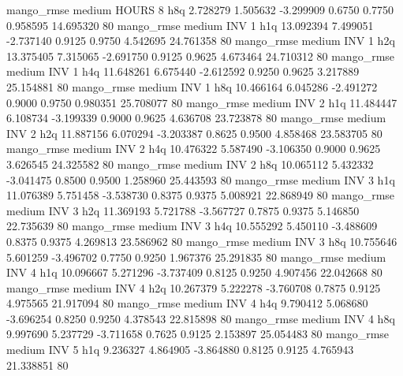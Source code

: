        mango_rmse     medium    HOURS                 8                  h8q  2.728279 1.505632 -3.299909 0.6750 0.7750  0.958595   14.695320 80
       mango_rmse     medium      INV                 1                  h1q 13.092394 7.499051 -2.737140 0.9125 0.9750  4.542695   24.761358 80
       mango_rmse     medium      INV                 1                  h2q 13.375405 7.315065 -2.691750 0.9125 0.9625  4.673464   24.710312 80
       mango_rmse     medium      INV                 1                  h4q 11.648261 6.675440 -2.612592 0.9250 0.9625  3.217889   25.154881 80
       mango_rmse     medium      INV                 1                  h8q 10.466164 6.045286 -2.491272 0.9000 0.9750  0.980351   25.708077 80
       mango_rmse     medium      INV                 2                  h1q 11.484447 6.108734 -3.199339 0.9000 0.9625  4.636708   23.723878 80
       mango_rmse     medium      INV                 2                  h2q 11.887156 6.070294 -3.203387 0.8625 0.9500  4.858468   23.583705 80
       mango_rmse     medium      INV                 2                  h4q 10.476322 5.587490 -3.106350 0.9000 0.9625  3.626545   24.325582 80
       mango_rmse     medium      INV                 2                  h8q 10.065112 5.432332 -3.041475 0.8500 0.9500  1.258960   25.443593 80
       mango_rmse     medium      INV                 3                  h1q 11.076389 5.751458 -3.538730 0.8375 0.9375  5.008921   22.868949 80
       mango_rmse     medium      INV                 3                  h2q 11.369193 5.721788 -3.567727 0.7875 0.9375  5.146850   22.735639 80
       mango_rmse     medium      INV                 3                  h4q 10.555292 5.450110 -3.488609 0.8375 0.9375  4.269813   23.586962 80
       mango_rmse     medium      INV                 3                  h8q 10.755646 5.601259 -3.496702 0.7750 0.9250  1.967376   25.291835 80
       mango_rmse     medium      INV                 4                  h1q 10.096667 5.271296 -3.737409 0.8125 0.9250  4.907456   22.042668 80
       mango_rmse     medium      INV                 4                  h2q 10.267379 5.222278 -3.760708 0.7875 0.9125  4.975565   21.917094 80
       mango_rmse     medium      INV                 4                  h4q  9.790412 5.068680 -3.696254 0.8250 0.9250  4.378543   22.815898 80
       mango_rmse     medium      INV                 4                  h8q  9.997690 5.237729 -3.711658 0.7625 0.9125  2.153897   25.054483 80
       mango_rmse     medium      INV                 5                  h1q  9.236327 4.864905 -3.864880 0.8125 0.9125  4.765943   21.338851 80
